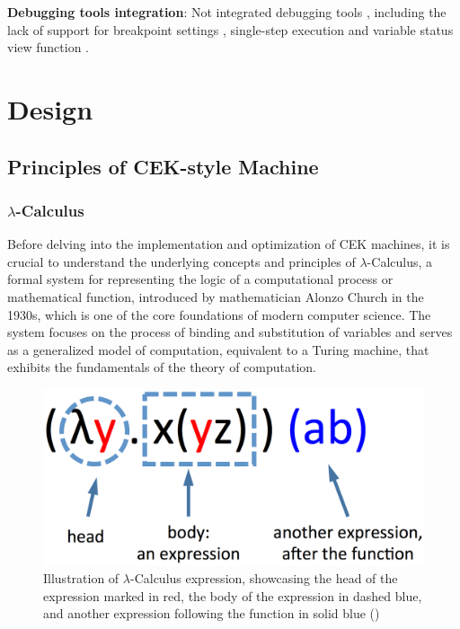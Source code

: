 \documentclass{l4proj}
\begin{document}
\textbf{Debugging tools integration}: Not integrated debugging tools , including the lack of support for breakpoint settings , single-step execution and variable status view function .


\chapter{Design}

\section{Principles of CEK-style Machine}

\subsection{$\lambda$-Calculus}
Before delving into the implementation and optimization of CEK machines, it is crucial to understand the underlying concepts and principles of $\lambda$-Calculus, a formal system for representing the logic of a computational process or mathematical function, introduced by mathematician Alonzo Church in the 1930s, which is one of the core foundations of modern computer science. The system focuses on the process of binding and substitution of variables and serves as a generalized model of computation, equivalent to a Turing machine, that exhibits the fundamentals of the theory of computation.

\begin{figure}[h]
    \centering
    \includegraphics[width=0.35\linewidth]{dissertation/images/lambda1.png}    
    \caption{Illustration of $\lambda$-Calculus expression, showcasing the head of the expression marked in red, the body of the expression in dashed blue, and another expression following the function in solid blue (\cite{a2015_the})}
    \label{fig:lambda} 
\end{figure}
\end{document}
